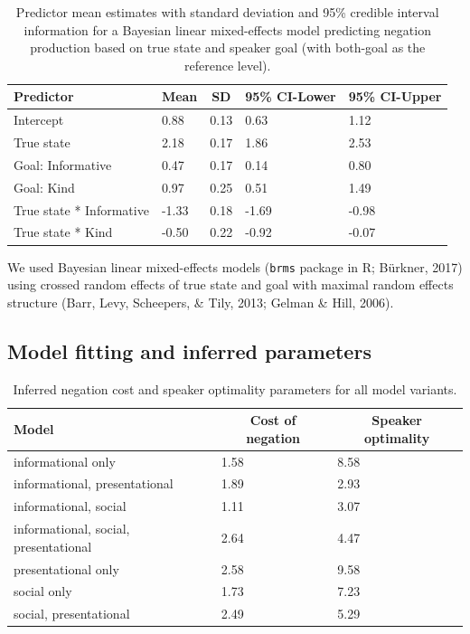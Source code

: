\documentclass[floatsintext,man]{apa6}
\theoremstyle{definition}
\theoremstyle{definition}
\theoremstyle{definition}
\theoremstyle{remark}
\begin{document}
\begin{table}[tbp]
\begin{center}
\begin{threeparttable}
\caption{\label{tab:brmTab}Predictor mean estimates with standard deviation and 95\% credible interval information for a Bayesian linear mixed-effects model predicting negation production based on true state and speaker goal (with both-goal as the reference level).}
\begin{tabular}{lllll}
\toprule
Predictor & \multicolumn{1}{c}{Mean} & \multicolumn{1}{c}{SD} & \multicolumn{1}{c}{95\% CI-Lower} & \multicolumn{1}{c}{95\% CI-Upper}\\
\midrule
Intercept & 0.88 & 0.13 & 0.63 & 1.12\\
True state & 2.18 & 0.17 & 1.86 & 2.53\\
Goal: Informative & 0.47 & 0.17 & 0.14 & 0.80\\
Goal: Kind & 0.97 & 0.25 & 0.51 & 1.49\\
True state * Informative & -1.33 & 0.18 & -1.69 & -0.98\\
True state * Kind & -0.50 & 0.22 & -0.92 & -0.07\\
\bottomrule
\end{tabular}
\end{threeparttable}
\end{center}
\end{table}

We used Bayesian linear mixed-effects models (\texttt{brms} package in
R; Bürkner, 2017) using crossed random effects of true state and goal
with maximal random effects structure (Barr, Levy, Scheepers, \& Tily,
2013; Gelman \& Hill, 2006).

\subsection{Model fitting and inferred
parameters}\label{model-fitting-and-inferred-parameters}

\begin{table}[tbp]
\begin{center}
\begin{threeparttable}
\caption{\label{tab:otherParams}Inferred negation cost and speaker optimality parameters for all model variants.}
\begin{tabular}{lll}
\toprule
Model & \multicolumn{1}{c}{Cost of negation} & \multicolumn{1}{c}{Speaker optimality}\\
\midrule
informational only & 1.58 & 8.58\\
informational, presentational & 1.89 & 2.93\\
informational, social & 1.11 & 3.07\\
informational, social, presentational & 2.64 & 4.47\\
presentational only & 2.58 & 9.58\\
social only & 1.73 & 7.23\\
social, presentational & 2.49 & 5.29\\
\bottomrule
\end{tabular}
\end{threeparttable}
\end{center}
\end{table}
\end{document}
